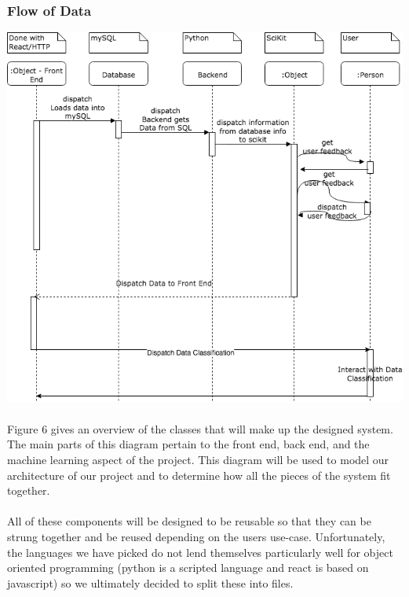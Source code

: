 \documentclass[12pt,oneside,letterpaper]{article}
\begin{document}
\subsubsection{Flow of Data}
\includegraphics[scale = 0.52]{YarmSequenceDiagram.png}
\begingroup
{}
\endgroup

\paragraph{}Figure 6 gives an overview of the classes that will make up the designed system. The main parts of this diagram pertain to the front end, back end, and the machine learning aspect of the project. This diagram will be used to model our architecture of our project and to determine how all the pieces of the system fit together. 
 \paragraph{} All of these components will be designed to be reusable so that they can be strung together and be reused depending on the users use-case. Unfortunately, the languages we have picked do not lend themselves particularly well for object oriented programming (python is a scripted language and react is based on javascript) so we ultimately decided to split these into files.
 
\end{document}
